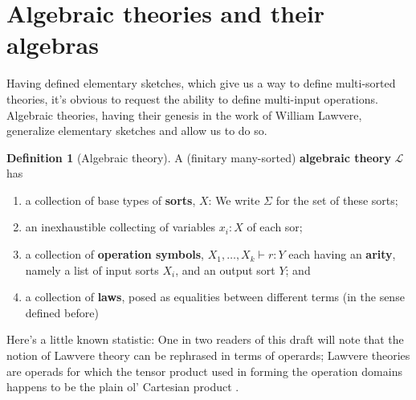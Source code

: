 \documentclass[12pt,twoside]{reedthesis}
\theoremstyle{definition}
\newtheorem{definition}{Definition}
\theoremstyle{remark}
\theoremstyle{theorem}
\begin{document}
\section{Algebraic theories and their algebras}
Having defined elementary sketches, which give us a way to define multi-sorted
theories, it's obvious to request the ability to define multi-input operations.
Algebraic theories, having their genesis in the work of William Lawvere,
generalize elementary sketches and allow us to do so.
\begin{definition}[Algebraic theory]\label{def:alg theory}
  A (finitary many-sorted) \textbf{algebraic theory} $\mathcal{L}$ has
  \begin{enumerate}
    \item a collection of base types of \textbf{sorts}, $X$: We write $\Sigma$ for the set of these sorts;
    \item an inexhaustible collecting of variables $x_{i}:X$ of each sor;
    \item a collection of \textbf{operation symbols}, $X_{1},\dots , X_{k} \vdash r : Y$ each having an \textbf{arity}, namely a list of input sorts $X_{i}$, and an output sort $Y$; and
    \item a collection of \textbf{laws}, posed as equalities between different
          terms (in the sense defined before)
  \end{enumerate}
\end{definition}
Here's a little known statistic: One in two readers of this draft will note that
the notion of Lawvere theory can be rephrased in terms of operards; Lawvere
theories are operads for which the tensor product used in forming the operation
domains happens to be the plain ol' Cartesian product \cite{TODO: Nlab}.
\end{document}
